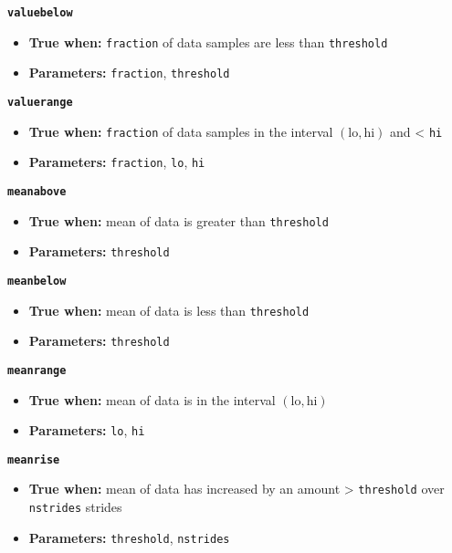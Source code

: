{{\large\texttt{\textbf{valuebelow}}}

\begin{itemize}
\item \textbf{True when:} \texttt{fraction} of data samples are less than
  \texttt{threshold}
\item \textbf{Parameters:} \texttt{fraction}, \texttt{threshold}
\end{itemize}


{\large\texttt{\textbf{valuerange}}}

\begin{itemize}
\item \textbf{True when:} \texttt{fraction} of data samples in the interval 
  $(\mathrm{lo}, \mathrm{hi})$
  and < \texttt{hi}
\item \textbf{Parameters:} \texttt{fraction}, \texttt{lo}, \texttt{hi}
\end{itemize}

{\large\texttt{\textbf{meanabove}}}

\begin{itemize}
\item \textbf{True when:} mean of data is greater than
  \texttt{threshold}
\item \textbf{Parameters:} \texttt{threshold}
\end{itemize}


{\large\texttt{\textbf{meanbelow}}}

\begin{itemize}
\item \textbf{True when:} mean of data is less than
  \texttt{threshold}
\item \textbf{Parameters:} \texttt{threshold}
\end{itemize}


{\large\texttt{\textbf{meanrange}}}

\begin{itemize}
\item \textbf{True when:} mean of data is in the interval 
  $(\mathrm{lo}, \mathrm{hi})$ 
\item \textbf{Parameters:} \texttt{lo}, \texttt{hi}
\end{itemize}

{\large\texttt{\textbf{meanrise}}}

\begin{itemize}
\item \textbf{True when:} mean of data has increased by an amount >
  \texttt{threshold} over \texttt{nstrides} strides
\item \textbf{Parameters:} \texttt{threshold}, \texttt{nstrides}
\end{itemize}

}
